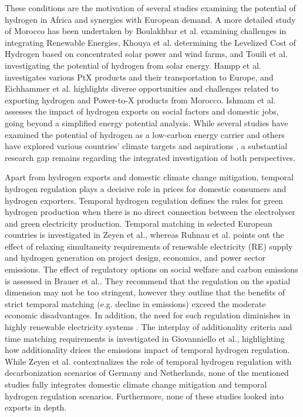 These conditions are the motivation of several studies \cite{vanWijk2021, AbouSeada2022, vanderZwaan2021, Schellekens2010, Cavana2021, Touili2022, Timmerberg2019a, Sens2022, Franzmann2023} examining the potential of hydrogen in Africa and synergies with European demand. A more detailed study of Morocco has been undertaken by Boulakhbar et al.\cite{Boulakhbar2020} examining challenges in integrating Renewable Energies, Khouya et al.\cite{Khouya2020} determining the Levelized Cost of Hydrogen based on concentrated solar power and wind farms, and Touili et al.\cite{Touili2018} investigating the potential of hydrogen from solar energy. Hampp et al.\cite{Hampp2023} investigates various PtX products and their transportation to Europe, and Eichhammer et al. \cite{Eichhammer2019} highlights diverse opportunities and challenges related to exporting hydrogen and Power-to-X products from Morocco. Ishmam et al. \cite{Ishmam2024} assesses the impact of hydrogen exports on social factors and domestic jobs, going beyond a simplified energy potential analysis.
While several studies \cite{Hampp2023, AbouSeada2022, vanWijk2021} have examined the potential of hydrogen as a low-carbon energy carrier and others have explored various countries' climate targets and aspirations \cite{Boulakhbar2020}, a substantial research gap remains regarding the integrated investigation of both perspectives. 


Apart from hydrogen exports and domestic climate change mitigation, temporal hydrogen regulation plays a decisive role in prices for domestic consumers and hydrogen exporters. 
Temporal hydrogen regulation defines the rules for green hydrogen production when there is no direct connection between the electrolyser and green electricity production.
Temporal matching in selected European countries is investigated in Zeyen et al.\cite{Zeyen2024}, whereas Ruhnau et al.\cite{Ruhnau2023a} points out the effect of relaxing simultaneity requirements of renewable electricity (RE) supply and hydrogen generation on project design, economics, and power sector emissions.
The effect of regulatory options on social welfare and carbon emissions is assessed in Brauer et al.\cite{Brauer2022}. They recommend that the regulation on the spatial dimension may not be too stringent, however they outline that the benefits of strict temporal matching (e.g. decline in emissions) exceed the moderate economic disadvantages. In addition, the need for such regulation diminishes in highly renewable electricity systems \cite{Brauer2022}.
The interplay of additionality criteria and time matching requirements is investigated in Giovanniello et al.\cite{Giovanniello2024}, highlighting how additionality drices the emissions impact of temporal hydrogen regulation.
While Zeyen et al.\cite{Zeyen2024} contextualizes the role of temporal hydrogen regulation with decarbonization scenarios of Germany and Netherlands, none of the mentioned studies fully integrates domestic climate change mitigation and temporal hydrogen regulation scenarios. Furthermore, none of these studies looked into exports in depth.

